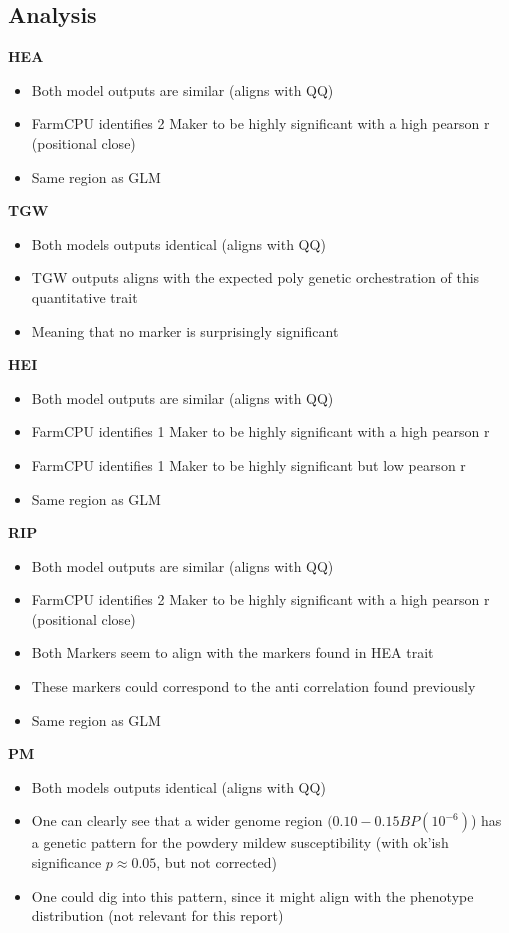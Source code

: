 \documentclass{article}
\begin{document}
		\subsection{Analysis}
		
			\textbf{HEA}
			\begin{itemize}
				\item Both model outputs are similar (aligns with QQ)
				\item FarmCPU identifies 2 Maker to be highly significant with a high pearson r (positional close)
				\item Same region as GLM
			\end{itemize}
			
			\textbf{TGW}
			\begin{itemize}
				\item Both models outputs identical (aligns with QQ)
				\item TGW outputs aligns with the expected poly genetic orchestration of this quantitative trait
				\item Meaning that no marker is surprisingly significant
			\end{itemize}
			
			\textbf{HEI}
			\begin{itemize}
				\item Both model outputs are similar (aligns with QQ)
				\item FarmCPU identifies 1 Maker to be highly significant with a high pearson r
				\item FarmCPU identifies 1 Maker to be highly significant but low pearson r
				\item Same region as GLM
			\end{itemize}
			
			\textbf{RIP}
			\begin{itemize}
				\item Both model outputs are similar (aligns with QQ)
				\item FarmCPU identifies 2 Maker to be highly significant with a high pearson r (positional close)
				\item Both Markers seem to align with the markers found in HEA trait
				\item These markers could correspond to the anti correlation found previously
				\item Same region as GLM
			\end{itemize}
			
			\textbf{PM}
			\begin{itemize}
				\item Both models outputs identical (aligns with QQ)
				\item One can clearly see that a wider genome region $(0.10-0.15 BP(10^{-6})$) has a genetic pattern for the powdery mildew susceptibility (with ok'ish significance $p\approx0.05$, but not corrected)
				\item One could dig into this pattern, since it might align with the phenotype distribution (not relevant for this report)
			\end{itemize}												
		\newpage
\end{document}
